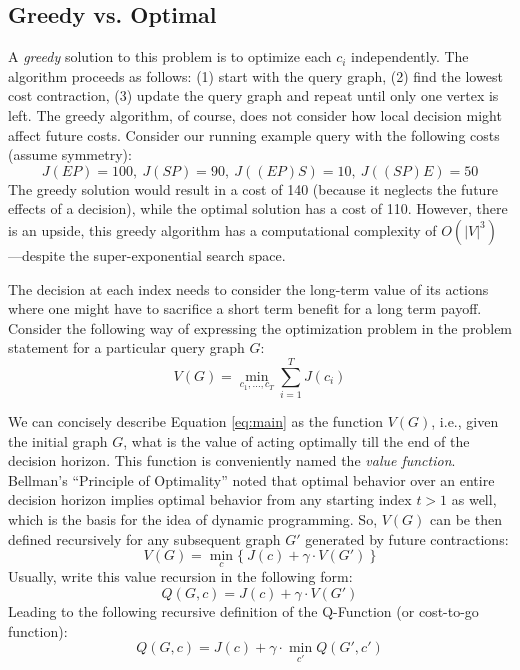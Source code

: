 \subsection{Greedy vs. Optimal}
A \emph{greedy} solution to this problem is to optimize each $c_i$ independently. The algorithm proceeds as follows: (1) start with the query graph, (2) find the lowest cost contraction, (3) update the query graph and repeat until only one vertex is left. The greedy algorithm, of course, does not consider how local decision might affect future costs. Consider our running example query with the following costs (assume symmetry):
\[J(EP)= 100,~J(SP)= 90,~J((EP)S)= 10,~J((SP)E)= 50\]
The greedy solution would result in a cost of 140 (because it neglects the future effects of a decision), while the optimal solution has a cost of 110.
However, there is an upside, this greedy algorithm has a computational complexity of $O(|V|^3)$---despite the super-exponential search space.

The decision at each index needs to consider the long-term value of its actions where one might have to sacrifice a short term benefit for a long term payoff.
Consider the following way of expressing the optimization problem in the problem statement for a particular query graph $G$:
\begin{equation}
V(G) = \min_{c_1,...,c_T} \sum_{i=1}^T J(c_i)
\label{eq:main}
\end{equation}

We can concisely describe Equation \ref{eq:main} as the function $V(G)$, i.e., given the initial graph $G$, what is the value of acting optimally till the end of the decision horizon. This function is conveniently named the \emph{value function}. Bellman's ``Principle of Optimality'' noted that optimal behavior over an entire decision horizon implies optimal behavior from any starting index $t>1$ as well, which is the basis for the idea of dynamic programming.
So, $V(G)$ can be then defined recursively for any subsequent graph $G'$ generated by future contractions:
\begin{equation}
V(G) = \min_{c}\{~J(c) + \gamma \cdot V(G') ~\}
\label{eq:value}
\end{equation}
Usually, write this value recursion in the following form:
\[
Q(G,c) = J(c) + \gamma \cdot V(G')
\]
Leading to the following recursive definition of the Q-Function (or cost-to-go function):
\begin{equation}
Q(G,c) = J(c) + \gamma \cdot \min_{c'} Q( G',c')
\label{eq:q}
\end{equation}


